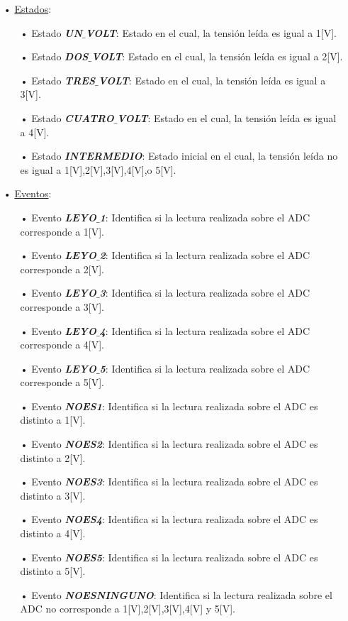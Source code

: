 \documentclass[12pt,letterpaper]{article}
\begin{document}
\begin{enumerate}
\begin{enumerate}
\item[•]\underline{Estados}:
\begin{enumerate}
\item[•]Estado \textit{\textbf{UN$\_$VOLT}}: Estado en el cual, la tensión leída es igual a 1[V].
\item[•]Estado \textit{\textbf{DOS$\_$VOLT}}: Estado en el cual, la tensión leída es igual a 2[V].
\item[•]Estado \textit{\textbf{TRES$\_$VOLT}}: Estado en el cual, la tensión leída es igual a 3[V].
\item[•]Estado \textit{\textbf{CUATRO$\_$VOLT}}: Estado en el cual, la tensión leída es igual a 4[V].
\item[•]Estado \textit{\textbf{INTERMEDIO}}: Estado inicial en el cual, la tensión leída no es igual a 1[V],2[V],3[V],4[V],o 5[V].
\end{enumerate}
\item[•]\underline{Eventos}:
\begin{enumerate}
\item[•]Evento \textit{\textbf{LEYO$\_$1}}: Identifica si la lectura realizada sobre el ADC corresponde a 1[V].
\item[•]Evento \textit{\textbf{LEYO$\_$2}}: Identifica si la lectura realizada sobre el ADC corresponde a 2[V].
\item[•]Evento \textit{\textbf{LEYO$\_$3}}: Identifica si la lectura realizada sobre el ADC corresponde a 3[V].
\item[•]Evento \textit{\textbf{LEYO$\_$4}}: Identifica si la lectura realizada sobre el ADC corresponde a 4[V].
\item[•]Evento \textit{\textbf{LEYO$\_$5}}: Identifica si la lectura realizada sobre el ADC corresponde a 5[V].
\item[•]Evento \textit{\textbf{NOES1}}: Identifica si la lectura realizada sobre el ADC es distinto a 1[V].
\item[•]Evento \textit{\textbf{NOES2}}: Identifica si la lectura realizada sobre el ADC es distinto a 2[V].
\item[•]Evento \textit{\textbf{NOES3}}: Identifica si la lectura realizada sobre el ADC es distinto a 3[V].
\item[•]Evento \textit{\textbf{NOES4}}: Identifica si la lectura realizada sobre el ADC es distinto a 4[V].
\item[•]Evento \textit{\textbf{NOES5}}: Identifica si la lectura realizada sobre el ADC es distinto a 5[V].
\item[•]Evento \textit{\textbf{NOESNINGUNO}}: Identifica si la lectura realizada sobre el ADC no corresponde a 1[V],2[V],3[V],4[V] y 5[V].
\end{enumerate}
\end{enumerate}


\end{enumerate}
\end{document}
